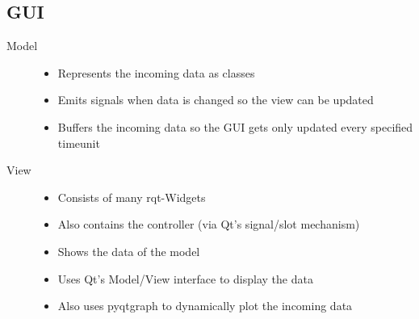\subsection{GUI}

\begin{description}
	\item[Model] \mbox{}	
		\begin{itemize}
		\item Represents the incoming data as classes
		\item Emits signals when data is changed so the view can be updated
		\item Buffers the incoming data so the GUI gets only updated every specified timeunit
		\end{itemize}
	\item[View] \mbox{}
		\begin{itemize}
		\item Consists of many rqt-Widgets
		\item Also contains the controller (via Qt's signal/slot mechanism)
		\item Shows the data of the model
		\item Uses Qt's Model/View interface to display the data
		\item Also uses pyqtgraph to dynamically plot the incoming data
		\end{itemize}
\end{description}